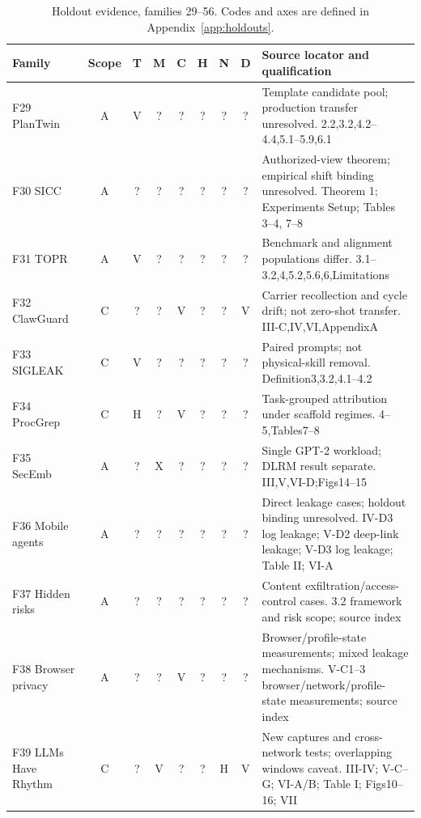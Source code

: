 \begin{table}[p]\centering\footnotesize
\caption{Holdout evidence, families 29--56. Codes and axes are defined in Appendix~\ref{app:holdouts}.}\label{tab:holdouts2}
\setlength{\tabcolsep}{3pt}\begin{tabularx}{\textwidth}{@{}p{}cccccccY@{}}\toprule
Family & Scope & T & M & C & H & N & D & Source locator and qualification\\\midrule
F29 PlanTwin~\cite{yu2026plantwin} & A & V & ? & ? & ? & ? & ? & Template candidate pool; production transfer unresolved. 2.2,3.2,4.2--4.4,5.1--5.9,6.1\\
F30 SICC~\cite{xu2026sicc} & A & ? & ? & ? & ? & ? & ? & Authorized-view theorem; empirical shift binding unresolved. Theorem 1; Experiments Setup; Tables 3--4, 7--8\\
F31 TOPR~\cite{qiao2026topr} & A & V & ? & ? & ? & ? & ? & Benchmark and alignment populations differ. 3.1--3.2,4,5.2,5.6,6,Limitations\\
F32 ClawGuard~\cite{gan2026clawguard} & C & ? & ? & V & ? & ? & V & Carrier recollection and cycle drift; not zero-shot transfer. III-C,IV,VI,AppendixA\\
F33 SIGLEAK~\cite{geng2026sigleak} & C & V & ? & ? & ? & ? & ? & Paired prompts; not physical-skill removal. Definition3,3.2,4.1--4.2\\
F34 ProcGrep~\cite{oderinwale2026procgrep} & C & H & ? & V & ? & ? & ? & Task-grouped attribution under scaffold regimes. 4--5,Tables7--8\\
F35 SecEmb~\cite{umar2025secemb} & A & ? & X & ? & ? & ? & ? & Single GPT-2 workload; DLRM result separate. III,V,VI-D;Figs14--15\\
F36 Mobile agents~\cite{wu2025mobileagents} & A & ? & ? & ? & ? & ? & ? & Direct leakage cases; holdout binding unresolved. IV-D3 log leakage; V-D2 deep-link leakage; V-D3 log leakage; Table II; VI-A\\
F37 Hidden risks~\cite{mudryi2025hidden} & A & ? & ? & ? & ? & ? & ? & Content exfiltration/access-control cases. 3.2 framework and risk scope; source index\\
F38 Browser privacy~\cite{ukani2025browserprivacy} & A & ? & ? & V & ? & ? & ? & Browser/profile-state measurements; mixed leakage mechanisms. V-C1--3 browser/network/profile-state measurements; source index\\
F39 LLMs Have Rhythm~\cite{alhazbi2025rhythm} & C & ? & V & ? & ? & H & V & New captures and cross-network tests; overlapping windows caveat. III-IV; V-C--G; VI-A/B; Table I; Figs10--16; VII\\

\end{tabularx}
\end{table}

